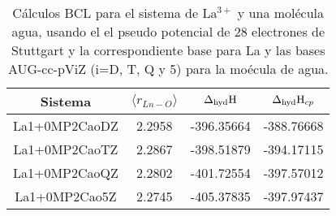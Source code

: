  \begin{center}                                                                            
 \begin{table}[h!]
 \centering
 \caption{\footnotesize C\'alculos BCL para el sistema de La$^{3+}$ y 
una mol\'ecula agua, usando el el pseudo potencial de 28 electrones 
de Stuttgart y la correspondiente base para La y las bases AUG-cc-pViZ
(i=D, T, Q y 5) para la mo\'ecula de agua.}                                                                  
 \begin{tabular}{c|ccc}\hline\hline                                                          
 Sistema & $\langle r_{Ln-O}\rangle$ & $\Delta_{\textnormal{hyd}}\textnormal{H}$ 
 & $\Delta_{\textnormal{hyd}}\textnormal{H}_{cp}$ \\ \hline                                               
La1+0MP2CaoDZ & 2.2958 & -396.35664 & -388.76668 \\
La1+0MP2CaoTZ & 2.2867 & -398.51879 & -394.17115 \\
La1+0MP2CaoQZ & 2.2802 & -401.72554 & -397.57012 \\
La1+0MP2Cao5Z & 2.2745 & -405.37835 & -397.97437 \\
 \hline \end{tabular}\label{tLaCao} 
 \end{table}                                                           
 \end{center}                                                                              
